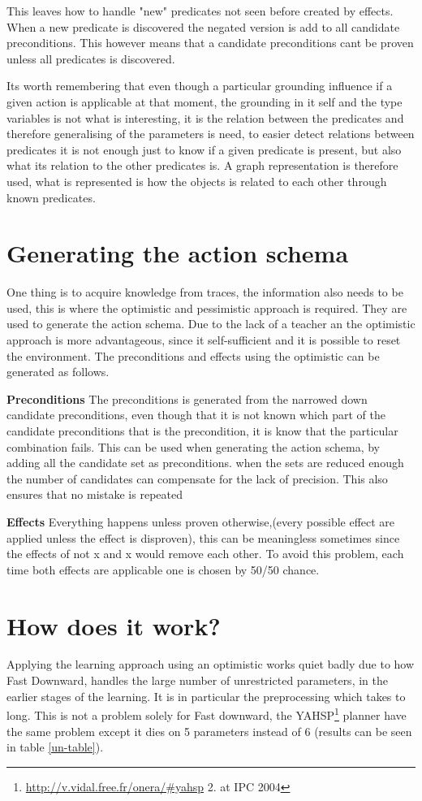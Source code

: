 	This leaves how to handle "new" predicates not seen before created by effects. When a new predicate is discovered the negated version is add to all candidate preconditions. This however means that a candidate preconditions cant be proven unless all predicates is discovered. 


	Its worth remembering that even though a particular grounding influence if a given action is applicable at that moment, the grounding in it self and the type variables is not what is interesting, it is the relation between the predicates and therefore generalising of the parameters is need, to easier detect relations between predicates it is not enough just to know if a given predicate is present, but also what its relation to the other predicates is. A graph representation is therefore used, what is represented is how the objects is related to each other through known predicates.


\section{Generating the action schema}
One thing is to acquire knowledge from traces, the information also needs to be used, this is where the optimistic and pessimistic approach is required. They are used to generate the action schema. Due to the lack of a teacher an the optimistic approach is more advantageous, since it self-sufficient and it is possible to reset the environment. The preconditions and effects using the optimistic can be generated as follows. 


\textbf{Preconditions}
The preconditions is generated from the narrowed down candidate preconditions, even though that it is not known which part of the candidate preconditions that is the precondition, it is know that the particular combination fails. This can be used when generating the action schema, by adding all the candidate set as preconditions. when the sets are reduced enough the number of candidates can compensate for the lack of precision. This also ensures that no mistake is repeated


\textbf{Effects}
Everything happens unless proven otherwise,(every possible effect are applied unless the effect is disproven), this can be meaningless sometimes since the effects of not x and x would remove each other. To avoid this problem, each time both effects are applicable one is chosen by 50/50 chance.

\section{How does it work?}
\label{toFree}
Applying the learning approach using an optimistic works quiet badly due to how Fast Downward, handles the large number of unrestricted parameters, in the earlier stages of the learning. It is in particular the preprocessing which takes to long. This is not a problem solely for Fast downward, the YAHSP\footnote{\url{http://v.vidal.free.fr/onera/\#yahsp} 2. at IPC 2004} planner have the same problem except it dies on 5 parameters instead of 6 (results can be seen in  table \ref{un-table}).

